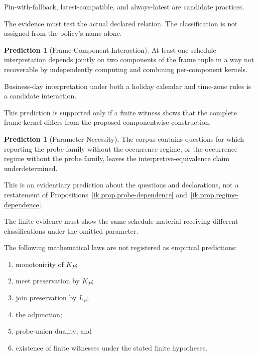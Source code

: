\documentclass[11pt]{article}
\theoremstyle{plain}
\theoremstyle{definition}
\newtheorem{prediction}[theorem]{Prediction}
\theoremstyle{remark}
\begin{document}
Pin-with-fallback,
latest-compatible,
and always-latest
are candidate practices.

The evidence must test
the actual declared relation.
The classification is not assigned
from the policy's name alone.

\begin{prediction}[Frame-Component Interaction]
  \label{ik.prediction.frame-interaction}
  At least one schedule interpretation
  depends jointly on two components
  of the frame tuple
  in a way not recoverable
  by independently computing
  and combining per-component kernels.
\end{prediction}

Business-day interpretation
under both a holiday calendar
and time-zone rules
is a candidate interaction.

This prediction is supported only if
a finite witness shows that
the complete frame kernel differs
from the proposed componentwise construction.

\begin{prediction}[Parameter Necessity]
  \label{ik.prediction.parameter-necessity}
  The corpus contains questions
  for which reporting the probe family
  without the occurrence regime,
  or the occurrence regime
  without the probe family,
  leaves the interpretive-equivalence claim
  underdetermined.
\end{prediction}

This is an evidentiary prediction
about the questions and declarations,
not a restatement of
Propositions~\ref{ik.prop.probe-dependence}
and~\ref{ik.prop.regime-dependence}.

The finite evidence must show
the same schedule material
receiving different classifications
under the omitted parameter.

The following mathematical laws
are not registered as empirical predictions:

\begin{enumerate}[label=(\alph*)]
  \item monotonicity of \(K_P\);
  \item meet preservation by \(K_P\);
  \item join preservation by \(L_P\);
  \item the adjunction;
  \item probe-union duality; and
  \item existence of finite witnesses under the stated finite hypotheses.
\end{enumerate}
\end{document}
